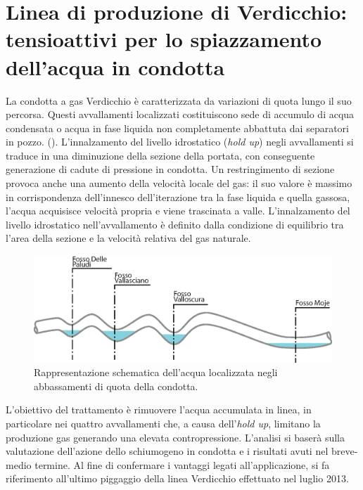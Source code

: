 \clearpage{\pagestyle{empty}\cleardoublepage}
\chapter{Linea di produzione di Verdicchio: tensioattivi per lo spiazzamento dell'acqua in condotta}\thispagestyle{empty} 
 La condotta a gas Verdicchio è caratterizzata da variazioni di quota lungo il suo percorsa. Questi avvallamenti localizzati costituiscono sede di accumulo di acqua condensata o acqua in fase liquida non completamente abbattuta dai separatori in pozzo. (). L'innalzamento del livello idrostatico (\textit{hold up}) negli avvallamenti si traduce in una diminuzione della sezione della portata, con conseguente generazione di cadute di pressione in condotta. Un restringimento di sezione provoca anche una aumento della velocità locale del gas: il suo valore è massimo in corrispondenza dell'innesco dell'iterazione tra la fase liquida e quella gassosa, l'acqua acquisisce velocità propria e viene trascinata a valle. L'innalzamento del livello idrostatico nell'avvallamento è definito dalla condizione di equilibrio tra l'area della sezione e la velocità relativa del gas naturale.

\begin{figure}[htbp] 
    \centering
    \includegraphics[width=\textwidth]{fig/test/avvallamenti.eps}
    \caption{Rappresentazione schematica dell'acqua localizzata negli abbassamenti di quota della condotta.} 
    \label{fig:acqua-avvallamenti}
\end{figure}

L'obiettivo del trattamento è rimuovere l'acqua accumulata in linea, in particolare nei quattro avvallamenti che, a causa dell'\textit{hold up}, limitano la produzione gas generando una elevata contropressione. L'analisi si baserà sulla valutazione dell'azione dello schiumogeno in condotta e i risultati avuti nel breve-medio termine. Al fine di confermare i vantaggi legati all'applicazione, si fa riferimento all'ultimo piggaggio della linea Verdicchio effettuato nel luglio 2013.

